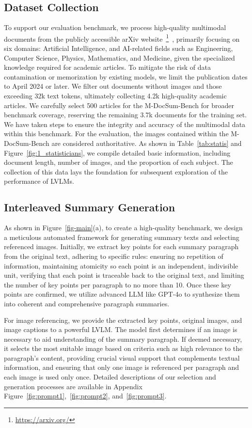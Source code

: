 \subsection{Dataset Collection}
\label{sec:3.2}
To support our evaluation benchmark, we process high-quality multimodal documents from the publicly accessible arXiv website~\footnote{\url{https://arxiv.org/}}~\cite{he2024pasa},
primarily focusing on six domains: Artificial Intelligence, and AI-related fields such as Engineering, Computer Science, Physics, Mathematics, and Medicine, given the specialized knowledge required for academic articles. 
To mitigate the risk of data contamination or memorization by existing models, we limit the publication dates to April 2024 or later. 
We filter out documents without images and those exceeding 32k text tokens, ultimately collecting 4.2k high-quality academic articles. 
We carefully select 500 articles for the M-DocSum-Bench for broader benchmark coverage, reserving the remaining 3.7k documents for the training set. 
We have taken steps to ensure the integrity and accuracy of the multimodal data within this benchmark.  
For the evaluation, the images contained within the M-DocSum-Bench are considered authoritative.
As shown in Table~\ref{tab:statis} and Figure~\ref{fig:1_statisticians}, we compile detailed basic information, including document length, number of images, and the proportion of each subject. 
The collection of this data lays the foundation for subsequent exploration of the performance of LVLMs.


\subsection{Interleaved Summary Generation}
\label{sec:3.3}
As shown in Figure~\ref{fig-main}(a), to create a high-quality benchmark, we design a meticulous automated framework for generating summary texts and selecting referenced images. 
Initially, we extract key points for each summary paragraph from the original text, adhering to specific rules: ensuring no repetition of information, maintaining atomicity so each point is an independent, indivisible unit, verifying that each point is traceable back to the original text, and limiting the number of key points per paragraph to no more than 10. 
Once these key points are confirmed, we utilize advanced LLM like GPT-4o to synthesize them into coherent and comprehensive paragraph summaries.

For image referencing, we provide the extracted key points, original images, and image captions to a powerful LVLM.
The model first determines if an image is necessary to aid understanding of the summary paragraph. 
If deemed necessary, it selects the most suitable image based on criteria such as high relevance to the paragraph's content, providing crucial visual support that complements textual information, and ensuring that only one image is referenced per paragraph and each image is used only once. 
Detailed descriptions of our selection and generation processes are available in Appendix Figure~\ref{fig:prompt1},~\ref{fig:prompt2}, and~\ref{fig:prompt3}.



